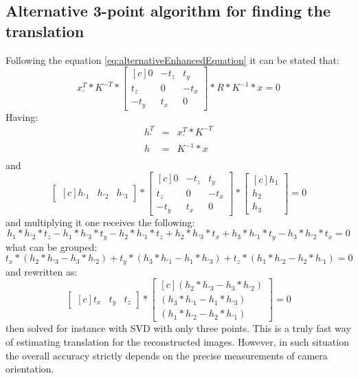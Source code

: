 \subsection{Alternative 3-point algorithm for finding the translation}
Following the equation \ref{eq:alternativeEnhancedEquation} it can be stated that:
\begin{equation} \label{eq:alternative3point}
{x}_{'}^{T} * K^{-T} * \begin{bmatrix*}[c]
 0 & -t_{z} & t_{y}\\
 t_{z} & 0 & -t_{x}\\
-t_{y} & t_{x} & 0 
\end{bmatrix*} * R * K^{-1} * x = 0
\end{equation}
Having:
\begin{equation} \label{eq:leftRelative}
\begin{array}{lcl}
h_{'}^{T} &=& {x}_{'}^{T} * K^{-T} \\
h &=& K^{-1} * x \\
\end{array}
\end{equation}
and 
\begin{equation} \label{eq:alternative3point}
\begin{bmatrix*}[c]
h_{'1} & h_{'2} & h_{'3}
\end{bmatrix*}
* \begin{bmatrix*}[c]
 0 & -t_{z} & t_{y}\\
 t_{z} & 0 & -t_{x}\\
-t_{y} & t_{x} & 0 
\end{bmatrix*} 
* \begin{bmatrix*}[c]
h_{1} \\
h_{2} \\
h_{3}
\end{bmatrix*}
= 0
\end{equation}
and multiplying it one receives the following:
\begin{equation} \label{eq:alternative3point}
h_{1}*h_{'2}*t_{z} - h_{1}*h_{'3}*t_{y} - h_{2}*h_{'1}*t_{z} + h_{2}*h_{'3}*t_{x} + h_{3}*h_{'1}*t_{y} - h_{3}*h_{'2}*t_{x}
= 0
\end{equation}
what can be grouped:
\begin{equation}
t_{x} * (h_{2}*h_{'3} - h_{3}*h_{'2}) + t_{y} * (h_{3}*h_{'1} - h_{1}*h_{'3}) + t_{z} * (h_{1}*h_{'2} - h_{2}*h_{'1}) = 0
\end{equation}
and rewritten as:
\begin{equation} \label{eq:translation3point}
\begin{bmatrix*}[c]
t_{x} &
t_{y} &
t_{z}
\end{bmatrix*} * \begin{bmatrix*}[c]
(h_{2}*h_{'3} - h_{3}*h_{'2}) \\ 
(h_{3}*h_{'1} - h_{1}*h_{'3}) \\
(h_{1}*h_{'2} - h_{2}*h_{'1}) 
\end{bmatrix*} 
= 0
\end{equation}
then solved for instance with SVD with only three points. This is a truly fast way of estimating translation for the reconstructed images. However, in such situation the overall accuracy strictly depends on the precise measurements of camera orientation.

